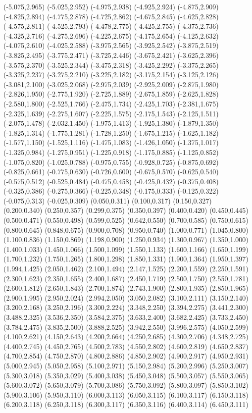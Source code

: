(-5.075,2.965) (-5.025,2.952) (-4.975,2.938) (-4.925,2.924) (-4.875,2.909) (-4.825,2.894) (-4.775,2.878) (-4.725,2.862) (-4.675,2.845) (-4.625,2.828) (-4.575,2.811) (-4.525,2.793) (-4.478,2.775) (-4.425,2.755) (-4.375,2.736) (-4.325,2.716) (-4.275,2.696) (-4.225,2.675) (-4.175,2.654) (-4.125,2.632) (-4.075,2.610) (-4.025,2.588) (-3.975,2.565) (-3.925,2.542) (-3.875,2.519) (-3.825,2.495) (-3.775,2.471) (-3.725,2.446) (-3.675,2.421) (-3.625,2.396) (-3.575,2.370) (-3.525,2.344) (-3.475,2.318) (-3.425,2.292) (-3.375,2.265) (-3.325,2.237) (-3.275,2.210) (-3.225,2.182) (-3.175,2.154) (-3.125,2.126) (-3.081,2.100) (-3.025,2.068) (-2.975,2.039) (-2.925,2.009) (-2.875,1.980) (-2.826,1.950) (-2.775,1.920) (-2.725,1.889) (-2.675,1.859) (-2.625,1.828) (-2.580,1.800) (-2.525,1.766) (-2.475,1.734) (-2.425,1.703) (-2.381,1.675) (-2.325,1.639) (-2.275,1.607) (-2.225,1.575) (-2.175,1.543) (-2.125,1.511) (-2.075,1.478) (-2.032,1.450) (-1.975,1.413) (-1.925,1.380) (-1.879,1.350) (-1.825,1.314) (-1.775,1.281) (-1.728,1.250) (-1.675,1.215) (-1.625,1.182) (-1.577,1.150) (-1.525,1.116) (-1.475,1.083) (-1.426,1.050) (-1.375,1.017) (-1.325,0.984) (-1.275,0.951) (-1.225,0.918) (-1.175,0.885) (-1.125,0.852) (-1.075,0.820) (-1.025,0.788) (-0.975,0.755) (-0.928,0.725) (-0.875,0.692) (-0.825,0.661) (-0.775,0.630) (-0.726,0.600) (-0.675,0.570) (-0.625,0.540) (-0.575,0.512) (-0.525,0.484) (-0.475,0.458) (-0.425,0.432) (-0.375,0.408) (-0.325,0.386) (-0.275,0.366) (-0.225,0.348) (-0.175,0.333) (-0.125,0.322) (-0.075,0.313) (-0.025,0.309) (0.050,0.311) (0.100,0.317) (0.150,0.327) (0.200,0.340) (0.250,0.357) (0.299,0.375) (0.350,0.397) (0.400,0.420) (0.450,0.445) (0.500,0.471) (0.550,0.498) (0.599,0.525) (0.642,0.550) (0.700,0.585) (0.750,0.615) (0.800,0.645) (0.848,0.675) (0.900,0.708) (0.950,0.740) (1.000,0.771) (1.045,0.800) (1.100,0.836) (1.150,0.869) (1.198,0.900) (1.250,0.934) (1.300,0.967) (1.350,1.000) (1.400,1.033) (1.450,1.066) (1.500,1.099) (1.550,1.133) (1.600,1.166) (1.650,1.199) (1.700,1.232) (1.750,1.265) (1.800,1.298) (1.850,1.331) (1.900,1.364) (1.950,1.397) (1.994,1.425) (2.050,1.462) (2.100,1.494) (2.147,1.525) (2.200,1.559) (2.250,1.591) (2.300,1.623) (2.350,1.655) (2.400,1.687) (2.450,1.719) (2.500,1.750) (2.550,1.781) (2.600,1.812) (2.650,1.843) (2.700,1.874) (2.743,1.900) (2.800,1.935) (2.850,1.965) (2.900,1.995) (2.950,2.024) (2.994,2.050) (3.050,2.082) (3.100,2.111) (3.150,2.140) (3.200,2.168) (3.250,2.196) (3.300,2.224) (3.348,2.250) (3.394,2.275) (3.441,2.300) (3.488,2.325) (3.536,2.350) (3.584,2.375) (3.633,2.400) (3.682,2.425) (3.733,2.450) (3.784,2.475) (3.835,2.500) (3.888,2.525) (3.942,2.550) (3.996,2.575) (4.050,2.599) (4.100,2.621) (4.150,2.643) (4.200,2.664) (4.250,2.685) (4.300,2.706) (4.348,2.725) (4.400,2.745) (4.450,2.765) (4.500,2.783) (4.550,2.802) (4.600,2.819) (4.650,2.837) (4.700,2.854) (4.750,2.870) (4.800,2.886) (4.850,2.902) (4.900,2.917) (4.950,2.931) (5.000,2.945) (5.050,2.958) (5.100,2.971) (5.150,2.984) (5.200,2.996) (5.250,3.007) (5.300,3.018) (5.350,3.029) (5.400,3.038) (5.450,3.048) (5.500,3.057) (5.550,3.065) (5.600,3.072) (5.650,3.079) (5.700,3.086) (5.750,3.092) (5.800,3.097) (5.850,3.102) (5.900,3.106) (5.950,3.110) (6.000,3.113) (6.050,3.115) (6.100,3.117) (6.150,3.118) (6.200,3.118) (6.250,3.118) (6.300,3.117) (6.350,3.116) (6.400,3.114) (6.450,3.111) 